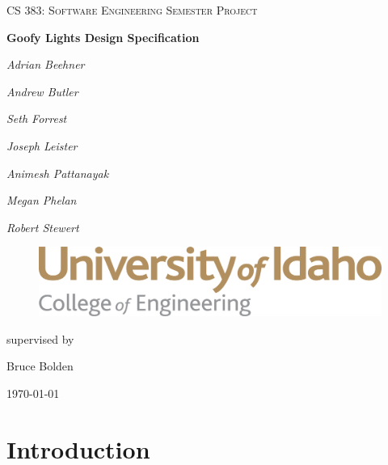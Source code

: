 \documentclass[12pt]{article}
\begin{document}
	\begin{titlepage}
		\centering
	
		\vspace{1cm}
		{\scshape\Large CS 383: Software Engineering Semester Project\par}
		\vspace{1.5cm}
		{\huge\bfseries Goofy Lights Design Specification\par}
		\vspace{2cm}
		
		{ 
		
		{\Large\itshape Adrian Beehner\par}
		{\Large\itshape Andrew Butler\par}
		{\Large\itshape Seth Forrest\par}
		{\Large\itshape Joseph Leister\par}
		{\Large\itshape Animesh Pattanayak\par}
		{\Large\itshape Megan Phelan\par}
		{\Large\itshape Robert Stewert\par}
		
		}
		
\begin{figure}
	\centering
	\includegraphics[width=0.7\linewidth]{uislogan}
\end{figure}
		\vfill
		supervised by\par
		Bruce Bolden
		
		\vfill
		
		{\large \today\par}
	\end{titlepage}

	\tableofcontents
	\newpage
	
	\section{Introduction}
\end{document}
